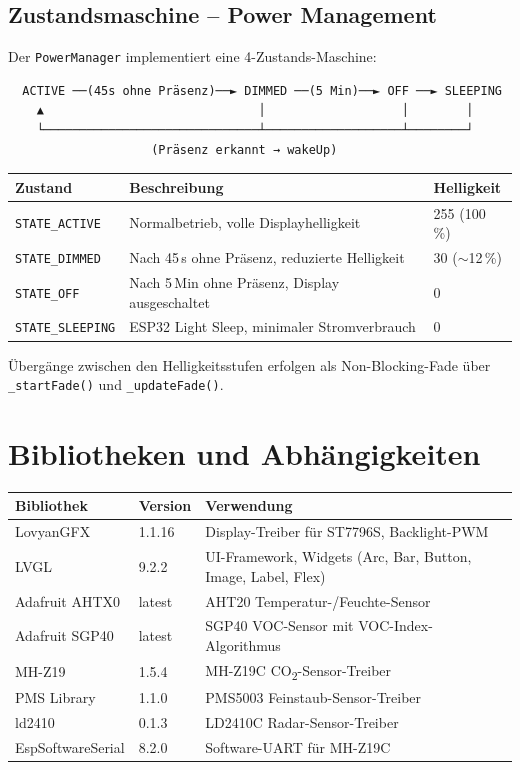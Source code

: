\documentclass[a4paper,11pt]{article}
\begin{document}
\subsection{Zustandsmaschine -- Power Management}

Der \texttt{PowerManager} implementiert eine 4-Zustands-Maschine:

\begin{verbatim}
  ACTIVE ──(45s ohne Präsenz)──► DIMMED ──(5 Min)──► OFF ──► SLEEPING
    ▲                              │                   │        │
    └──────────────────────────────┴───────────────────┴────────┘
                    (Präsenz erkannt → wakeUp)
\end{verbatim}

\begin{tabularx}{\textwidth}{lXl}
\toprule
\rowcolor{tableheader}
\textbf{Zustand} & \textbf{Beschreibung} & \textbf{Helligkeit} \\
\midrule
\texttt{STATE\_ACTIVE} & Normalbetrieb, volle Displayhelligkeit & 255 (100\,\%) \\
\texttt{STATE\_DIMMED} & Nach 45\,s ohne Präsenz, reduzierte Helligkeit & 30 ($\sim$12\,\%) \\
\texttt{STATE\_OFF} & Nach 5\,Min ohne Präsenz, Display ausgeschaltet & 0 \\
\texttt{STATE\_SLEEPING} & ESP32 Light Sleep, minimaler Stromverbrauch & 0 \\
\bottomrule
\end{tabularx}

Übergänge zwischen den Helligkeitsstufen erfolgen als Non-Blocking-Fade über \texttt{\_startFade()} und \texttt{\_updateFade()}.

\section{Bibliotheken und Abhängigkeiten}

\begin{tabularx}{\textwidth}{llX}
\toprule
\rowcolor{tableheader}
\textbf{Bibliothek} & \textbf{Version} & \textbf{Verwendung} \\
\midrule
LovyanGFX & 1.1.16 & Display-Treiber für ST7796S, Backlight-PWM \\
LVGL & 9.2.2 & UI-Framework, Widgets (Arc, Bar, Button, Image, Label, Flex) \\
Adafruit AHTX0 & latest & AHT20 Temperatur-/Feuchte-Sensor \\
Adafruit SGP40 & latest & SGP40 VOC-Sensor mit VOC-Index-Algorithmus \\
MH-Z19 & 1.5.4 & MH-Z19C CO\textsubscript{2}-Sensor-Treiber \\
PMS Library & 1.1.0 & PMS5003 Feinstaub-Sensor-Treiber \\
ld2410 & 0.1.3 & LD2410C Radar-Sensor-Treiber \\
EspSoftwareSerial & 8.2.0 & Software-UART für MH-Z19C \\
\bottomrule
\end{tabularx}
\end{document}
